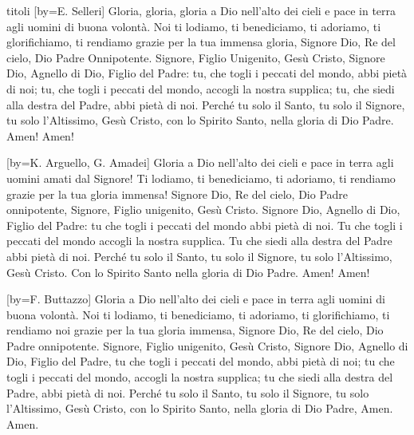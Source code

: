 \begin{songs}{titoli}
[by={E. Selleri}]
\beginchorus
Gloria, gloria, gloria a Dio nell'alto dei cieli
e pace in terra agli uomini di buona volontà.
\endchorus
\beginverse*
Noi ti lodiamo, ti benediciamo, ti adoriamo, ti glorifichiamo,
ti rendiamo grazie per la tua immensa gloria,
Signore Dio, Re del cielo, Dio Padre Onnipotente.
Signore, Figlio Unigenito, Gesù Cristo, Signore Dio,
Agnello di Dio, Figlio del Padre:
tu, che togli i peccati del mondo, abbi pietà di noi;
tu, che togli i peccati del mondo, accogli la nostra supplica;
tu, che siedi alla destra del Padre, abbi pietà di noi.
Perché tu solo il Santo, tu solo il Signore,
tu solo l'Altissimo, Gesù Cristo,
con lo Spirito Santo, nella gloria di Dio Padre.
Amen! Amen!
\endverse
\endsong

[by={K. Arguello, G. Amadei}]
\beginchorus
Gloria a Dio nell'alto dei cieli
e pace in terra agli uomini amati dal Signore!
Ti lodiamo, ti benediciamo,
ti adoriamo, ti rendiamo grazie per la tua gloria immensa!
\endchorus
\beginverse
Signore Dio, Re del cielo, Dio Padre onnipotente,
Signore, Figlio unigenito, Gesù Cristo.
\endverse
\beginverse
Signore Dio, Agnello di Dio, Figlio del Padre:
tu che togli i peccati del mondo abbi pietà di noi.
\endverse
\beginverse
Tu che togli i peccati del mondo accogli la nostra supplica.
Tu che siedi alla destra del Padre abbi pietà di noi.
\endverse
\beginverse
Perché tu solo il Santo, tu solo il Signore,
tu solo l'Altissimo, Gesù Cristo.
Con lo Spirito Santo nella gloria di Dio Padre.
\endverse
\beginverse*
Amen! Amen!
\endverse
\endsong

[by={F. Buttazzo}]
\beginchorus
Gloria a Dio nell'alto dei cieli e pace in terra
agli uomini di buona volontà.
\endchorus
\beginverse
Noi ti lodiamo, ti benediciamo,
ti adoriamo, ti glorifichiamo,
ti rendiamo noi grazie per la tua gloria immensa,
Signore Dio, Re del cielo, Dio Padre onnipotente.
\endverse
\beginverse
Signore, Figlio unigenito,
Gesù Cristo, Signore Dio,
Agnello di Dio, Figlio del Padre,
tu che togli i peccati del mondo,
abbi pietà di noi;
tu che togli i peccati del mondo,
accogli la nostra supplica;
tu che siedi alla destra del Padre,
abbi pietà di noi.
\endverse
\beginverse
Perché tu solo il Santo, tu solo il Signore,
tu solo l'Altissimo, Gesù Cristo,
con lo Spirito Santo, nella gloria di Dio Padre,
Amen. Amen.
\endverse
\endsong


\end{songs}
